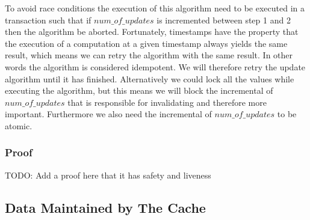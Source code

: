 To avoid race conditions the execution of this algorithm need to be executed in a transaction such that if $num\_of\_updates$ is incremented between step 1 and 2 then the algorithm be aborted. Fortunately, timestamps have the property that the execution of a computation at a given timestamp always yields the same result, which means we can retry the algorithm with the same result. In other words the algorithm is considered idempotent. We will therefore retry the update algorithm until it has finished. Alternatively we could lock all the values while executing the algorithm, but this means we will block the incremental of $num\_of\_updates$ that is responsible for invalidating and therefore more important.
Furthermore we also need the incremental of $num\_of\_updates$ to be atomic.

\subsubsection{Proof}
\label{subsubsec:proof}

TODO: Add a proof here that it has safety and liveness





\subsection{Data Maintained by The Cache}
\label{subsec:data-maintained-by-the-cache}

